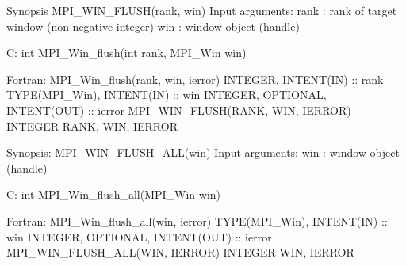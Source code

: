 Synopsis
MPI_WIN_FLUSH(rank, win)
Input arguments:
rank : rank of target window (non-negative integer)
win : window object (handle)

C:
int MPI_Win_flush(int rank, MPI_Win win)

Fortran:
MPI_Win_flush(rank, win, ierror)
INTEGER, INTENT(IN) :: rank
TYPE(MPI_Win), INTENT(IN) :: win
INTEGER, OPTIONAL, INTENT(OUT) :: ierror
MPI_WIN_FLUSH(RANK, WIN, IERROR)
INTEGER RANK, WIN, IERROR

Synopsis:
MPI_WIN_FLUSH_ALL(win)
Input arguments:
win : window object (handle)

C:
int MPI_Win_flush_all(MPI_Win win)

Fortran:
MPI_Win_flush_all(win, ierror)
TYPE(MPI_Win), INTENT(IN) :: win
INTEGER, OPTIONAL, INTENT(OUT) :: ierror
MPI_WIN_FLUSH_ALL(WIN, IERROR)
INTEGER WIN, IERROR
